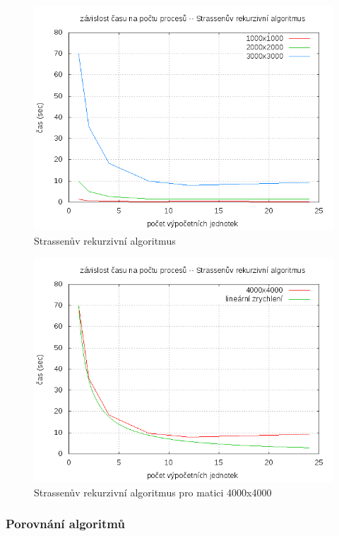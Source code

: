 \documentclass[12pt,a4paper]{article}
\begin{document}
\pagebreak
\begin{figure}[h]
\includegraphics[width=\textwidth]{graph/strassen.png}
\caption{Strassenův rekurzivní algoritmus}
\label{data4}
\end{figure}

\pagebreak
\begin{figure}[h]
\includegraphics[width=\textwidth]{graph/strassen-4000.png}
\caption{Strassenův rekurzivní algoritmus pro matici 4000x4000}
\label{data4}
\end{figure}




\pagebreak
\subsubsection{Porovnání algoritmů}
\end{document}
